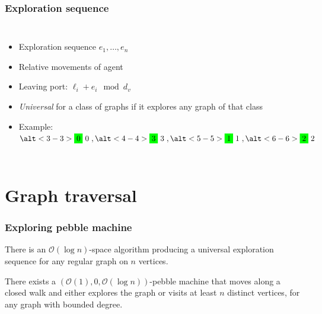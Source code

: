 \documentclass{beamer}
\begin{document}
\begin{frame}
  \frametitle{Exploration sequence}
  \begin{columns}
    \begin{itemize}
      \item Exploration sequence $e_{1},\dots, e_{n}$
      \item Relative movements of agent
      \item Leaving port: $\ell_{i} + e_{i}\mod d_{v}$
      \item \emph{Universal} for a class of graphs if it explores any graph of
        that class
      \item<2->[$\rightarrow$] Example:
        $\alt<3-3>{\colorbox{green}{0}}{\colorbox{white!0}{0}},
        \alt<4-4>{\colorbox{green}{3}}{\colorbox{white!0}{3}},
        \alt<5-5>{\colorbox{green}{1}}{\colorbox{white!0}{1}},
        \alt<6-6>{\colorbox{green}{2}}{\colorbox{white!0}{2}}$
    \end{itemize}
    \begin{center}
      \resizebox{\textwidth}{!}{}
    \end{center}
  \end{columns}
\end{frame}

\section{Graph traversal}
\begin{frame}
  \frametitle{Exploring pebble machine}
  \begin{mdframed}
    \begin{theorem}[Reingold]
      There is an $\mathcal{O}(\log n)$-space algorithm producing a universal
      exploration sequence for any regular graph on $n$ vertices.
    \end{theorem}
  \end{mdframed}
  \begin{center}
  \end{center}
  \begin{mdframed}
    \begin{theorem}
      There exists a $(\mathcal{O}(1), 0, \mathcal{O}(\log n))$-pebble machine
      that moves along a closed walk and either explores the graph or visits at
      least $n$ distinct vertices, for any graph with bounded degree.
    \end{theorem}
  \end{mdframed}
\end{frame}
\end{document}
